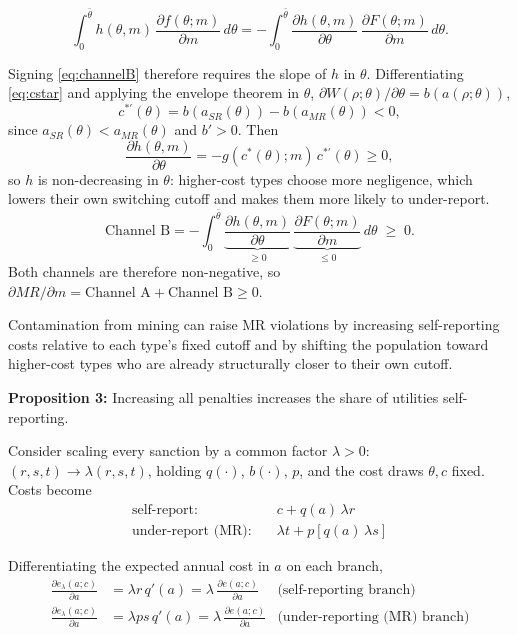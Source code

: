 \documentclass[12pt]{article}
\begin{document}
	\begin{equation}\label{eq:channelB}
		\int_0^{\bar\theta} h(\theta,m)\,\frac{\partial f(\theta;m)}{\partial m}\, d\theta = -\int_0^{\bar\theta} \frac{\partial h(\theta,m)}{\partial\theta}\,\frac{\partial F(\theta;m)}{\partial m}\, d\theta.
	\end{equation}
    
    Signing \eqref{eq:channelB} therefore requires the slope of $h$ in $\theta$. Differentiating \eqref{eq:cstar} and applying the envelope theorem in $\theta$, $\partial W(\rho;\theta)/\partial\theta = b(a(\rho;\theta))$,
	\[
	c^{*\prime}(\theta) = b(a_{SR}(\theta)) - b(a_{MR}(\theta)) < 0,
	\]
	since $a_{SR}(\theta) < a_{MR}(\theta)$ and $b' > 0$. Then
	\[
	\frac{\partial h(\theta,m)}{\partial\theta} = -g(c^*(\theta);m)\,c^{*\prime}(\theta) \ge 0,
	\]
	so $h$ is non-decreasing in $\theta$: higher-cost types choose more negligence, which lowers their own switching cutoff and makes them more likely to under-report.
	\[
	\text{Channel B} = -\int_0^{\bar\theta} \underbrace{\frac{\partial h(\theta,m)}{\partial\theta}}_{\ge 0}\,\underbrace{\frac{\partial F(\theta;m)}{\partial m}}_{\le 0}\, d\theta \;\ge\; 0.
	\]
	Both channels are therefore non-negative, so $\partial MR/\partial m = \text{Channel A} + \text{Channel B} \ge 0$.
    
    Contamination from mining can raise MR violations by increasing self-reporting costs relative to each type's fixed cutoff and by shifting the population toward higher-cost types who are already structurally closer to their own cutoff.

	\textbf{Proposition 3:} Increasing all penalties increases the share of utilities self-reporting.
	
	Consider scaling every sanction by a common factor $\lambda>0$: $(r,s,t) \to \lambda(r,s,t)$, holding $q(\cdot)$, $b(\cdot)$, $p$, and the cost draws $\theta,c$ fixed. Costs become
    \begin{align*}
		\text{self-report:} \quad & c + q(a)\,\lambda r \\
		\text{under-report (MR):} \quad & \lambda t + p\left[q(a)\,\lambda s\right]
	\end{align*}
	
	Differentiating the expected annual cost in $a$ on each branch,
	\begin{align*}
		\frac{\partial e_\lambda(a;c)}{\partial a} &= \lambda r\,q'(a) = \lambda\, \frac{\partial e(a;c)}{\partial a} & \text{(self-reporting branch)} \\
		\frac{\partial e_\lambda(a;c)}{\partial a} &= \lambda ps\,q'(a) = \lambda\, \frac{\partial e(a;c)}{\partial a} & \text{(under-reporting (MR) branch)}
	\end{align*}
	
\end{document}

